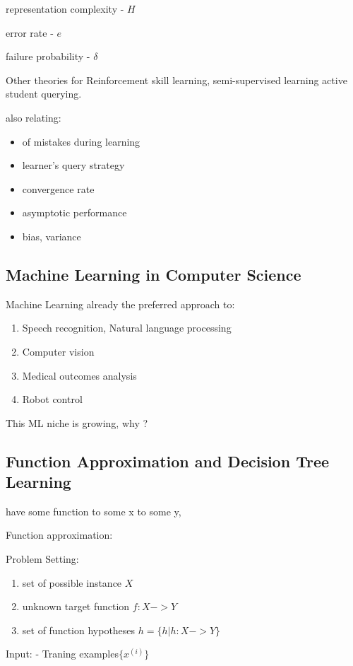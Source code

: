 \documentclass[twoside]{article}
\begin{document}
representation complexity - $H$

error rate - $e$

failure probability - $\delta$


Other theories for Reinforcement skill learning,
semi-supervised learning
active student querying.

also relating:

\begin{itemize}
\item of mistakes during learning
\item learner's query strategy
\item convergence rate
\item asymptotic performance
\item bias, variance
\end{itemize}

\subsection{Machine Learning in Computer Science}

Machine Learning already the preferred approach to:
\begin{enumerate}
\item Speech recognition, Natural language processing
\item Computer vision
\item Medical outcomes analysis
\item Robot control
\end{enumerate}

This ML niche is growing, why ?

\subsection{Function Approximation and Decision Tree Learning}

have some function to some x to some y, 

Function approximation:

Problem Setting:
\begin{enumerate}
\item set of possible instance $X$
\item unknown target function $f:X -> Y$
\item set of function hypotheses $h=\{h|h:X->Y\}$
\end{enumerate}

Input:
- Traning examples$\{x^{(i)}\}$
\end{document}
